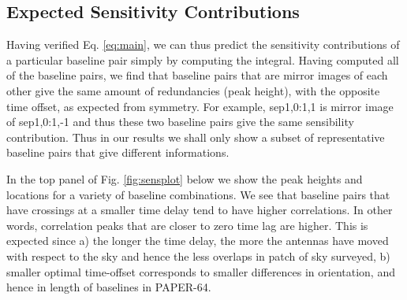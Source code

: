 \documentclass[preprint2,numberedappendix,tighten,twocolappendix]{aastex6}  %
\renewcommand\[{\begin{equation}}
\renewcommand\]{\end{equation}}
\begin{document}
\subsection{Expected Sensitivity Contributions}

Having verified Eq. \eqref{eq:main}, we can thus predict the sensitivity contributions of a
particular baseline pair simply by computing the integral. 
Having computed all of the baseline pairs, we find that baseline pairs that are mirror images of each other 
give the same amount of redundancies (peak height), with the opposite time offset, as expected from symmetry. 
For example, sep1,0:1,1 is mirror image of sep1,0:1,-1 and thus these two baseline pairs
give the same sensibility contribution. Thus in our results we shall only show a subset of representative baseline pairs 
that give different informations. 

In the top panel of Fig. \eqref{fig:sensplot} below
we show the peak heights and locations for a variety of baseline combinations.
We see that baseline pairs that have crossings at a smaller time delay
tend to have higher correlations. In other words, correlation peaks
that are closer to zero time lag are higher. This is expected since
a) the longer the time delay, the more the antennas have moved with respect
to the sky and hence the less overlaps in patch of sky surveyed, b) smaller optimal
time-offset corresponds to smaller differences in orientation, and hence in length of
baselines in PAPER-64. 
\end{document}
